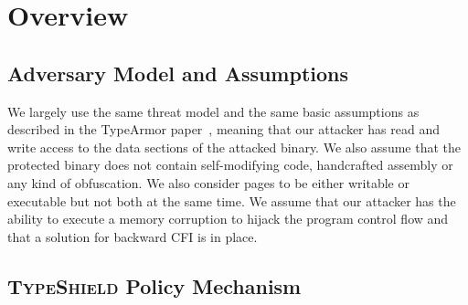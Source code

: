 \section{Overview}
\label{chapter:TypeShild Overview}

\subsection{Adversary Model and Assumptions}
\label{Adversary Model}

We largely use the same threat model and the same basic assumptions as described in the TypeArmor 
paper~\cite{veen:typearmor}, meaning that our attacker has read and write access to the data 
sections of the attacked binary.  We also assume that the protected binary does not contain 
self-modifying code, handcrafted assembly or any kind of obfuscation. We also consider pages 
to be either writable or executable but not both at the same time. We assume 
that our attacker has the ability to execute a memory corruption to hijack the program
control flow and that a solution for backward CFI is in place.

\subsection{\textsc{TypeShield} Policy Mechanism}
\label{TypeShield Policy Mechanism}

